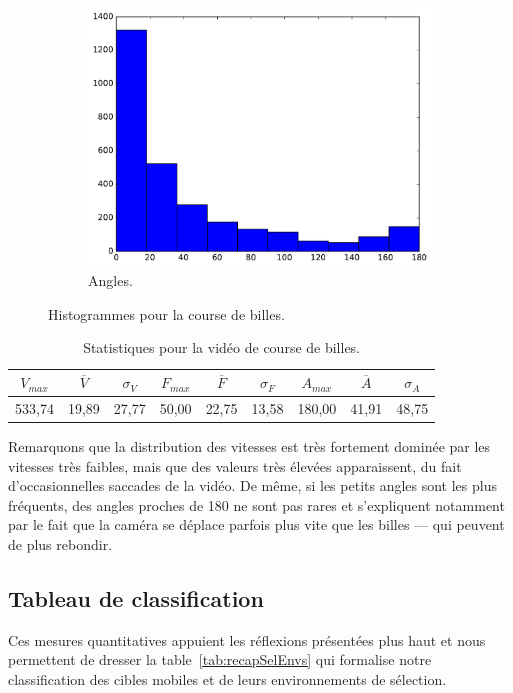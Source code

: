\begin{figure}[!htbp]
\begin{subfigure}[t]{\subImgWclicks}
			\includegraphics[width=\textwidth]{figures/ch3/bille_angle}
			\caption{Angles.}
			\label{fig:bille_angle}
		\end{subfigure}
		\caption[Histogrammes pour la course de billes]{Histogrammes pour la course de billes.}
		\label{fig:histBille}
	\end{figure}

\begin{table}
	\centering
	\begin{tabular}{c c c c c c c c c}
		$V_{max}$	& $\overline{V}$	& $\sigma_{V}$	& $F_{max}$	& $\overline{F}$	& $\sigma_{F}$	& $A_{max}$	& $\overline{A}$	& $\sigma_{A}$	\bigstrut[b] \\ \hline

		533,74		& 19,89				& 27,77			& 50,00		& 22,75				& 13,58			& 180,00	& 41,91				& 48,75			\bigstrut[t] \\
	\end{tabular}
	\caption[Statistiques pour la vidéo de course de billes]{Statistiques pour la vidéo de course de billes.}
	\label{tab:bille_stats}
\end{table}

	Remarquons que la distribution des vitesses est très fortement dominée par les vitesses très faibles, mais que des valeurs très élevées apparaissent, du fait d'occasionnelles saccades de la vidéo. De même, si les petits angles sont les plus fréquents, des angles proches de 180\textdegree{} ne sont pas rares et s'expliquent notamment par le fait que la caméra se déplace parfois plus vite que les billes --- qui peuvent de plus rebondir.
	
	\FloatBarrier \subsection{Tableau de classification}
	Ces mesures quantitatives appuient les réflexions présentées plus haut et nous permettent de dresser la table~\ref{tab:recapSelEnvs} qui formalise notre classification des cibles mobiles et de leurs environnements de sélection.
	

